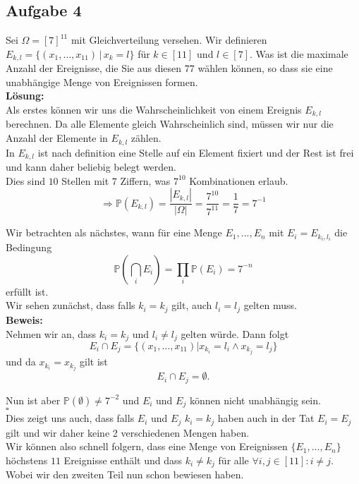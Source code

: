 \documentclass[11pt,a4paper,ngerman]{article}
\newcommand{\Prob}{\mathbb{P}}
\begin{document}
\subsection*{Aufgabe 4}

Sei $\Omega = [7]^{11}$ mit Gleichverteilung versehen. Wir definieren $E_{k,l} = \{(x_1, \ldots , x_11) \, | \, x_k = l \}$ für $k \in [11]$ und $l \in [7]$.
Was ist die maximale Anzahl der Ereignisse, die Sie aus diesen $77$ wählen können, so dass sie eine unabhängige Menge von Ereignissen formen.\\

\textbf{Lösung:}\\

Als erstes können wir uns die Wahrscheinlichkeit von einem Ereignis $E_{k,l}$ berechnen. Da alle Elemente gleich Wahrscheinlich sind,
müssen wir nur die Anzahl der Elemente in $E_{k,l}$ zählen.\\
In $E_{k,l}$ ist nach definition eine Stelle auf ein Element fixiert und der  Rest ist frei und kann daher beliebig belegt werden.\\
Dies sind $10$ Stellen mit $7$ Ziffern, was $7^{10}$ Kombinationen erlaub.
\[
    \Rightarrow \Prob (E_{k,l}) = \frac{|E_{k,l}|}{|\Omega|} = \frac{7^{10}}{7^{11}} = \frac{1}{7} = 7^{-1}
\]

Wir betrachten als nächstes, wann für eine Menge $E_1, ..., E_n$ mit $E_i = E_{k_i, l_i}$ die Bedingung
\[
    \Prob( \bigcap_i E_i) = \prod_i \Prob (E_i) = 7^{-n}
\]
erfüllt ist.\\

Wir sehen zunächst, dass falls $k_i = k_j$ gilt, auch $l_i = l_j$ gelten muss.\\
\textbf{Beweis:}\\
    Nehmen wir an, dass $k_i = k_j$ und $l_i \not= l_j$ gelten würde.
    Dann folgt
    \[
        E_i \cap E_j = \{(x_1, \ldots, x_{11}) | x_{k_i} = l_i \land x_{k_j} = l_j\}
    \]
    und da $x_{k_i} = x_{k_j}$ gilt ist
    \[
        E_i \cap E_j = \emptyset.
    \]

    Nun ist aber $\Prob (\emptyset) \not= 7^{-2}$ und $E_i$ und $E_j$ können nicht unabhängig sein.\\
\mbox{}\hfill$\square$\\

Dies zeigt uns auch, dass falls $E_i$ und $E_j$ $k_i = k_j$ haben auch in der Tat $E_i = E_j$ gilt und wir daher keine 2 verschiedenen Mengen haben.\\

Wir können also schnell folgern, dass eine Menge von Ereignissen $\{E_1, \ldots, E_n\}$ höchstens $11$ Ereignisse enthält und dass $k_i \not= k_j$
für alle $\forall i,j \in [11] : i \not= j$. Wobei wir den zweiten Teil nun schon bewiesen haben.\\
\end{document}
